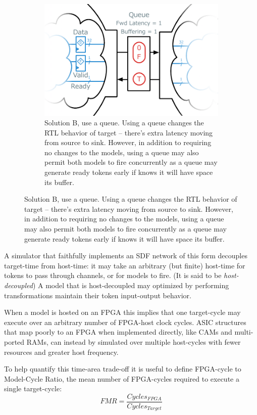 \begin{figure}
    \begin{subfigure}[t]{0.48\textwidth}
        \includegraphics[width=\textwidth]{figures/queue-decoupled-example.pdf}
        \caption{Solution B, use a queue. Using a queue changes the RTL
        behavior of target -- there's extra latency moving from source to sink.
        However, in addition to requiring no changes to the models, using a queue may also
        permit both models to fire concurrently as a queue may generate
        ready tokens early if knows it will have space its buffer.}
        \label{fig:queue-decoupled-example}
    \end{subfigure}
\end{figure}

A simulator that faithfully implements an SDF network of this form decouples
target-time from host-time: it may take an arbitrary (but finite) host-time for
tokens to pass through channels, or for models to fire. (It is said to be
\emph{host-decoupled}) A model that is host-decoupled may optimized by
performing transformations maintain their token input-output behavior.

When a model is hosted on an FPGA this implies that one target-cycle may
execute over an arbitrary number of FPGA-host clock cycles.  ASIC structures
that map poorly to an FPGA when implemented directly, like CAMs and
multi-ported RAMs, can instead by simulated over multiple host-cycles with
fewer resources and greater host frequency.

To help quantify this time-area trade-off it is useful to define FPGA-cycle to
Model-Cycle Ratio\cite{APorts}, the mean number of FPGA-cycles required to
execute a single target-cycle: $$ FMR = \frac{Cycles_{FPGA}}{Cycles_{Target}}
$$


